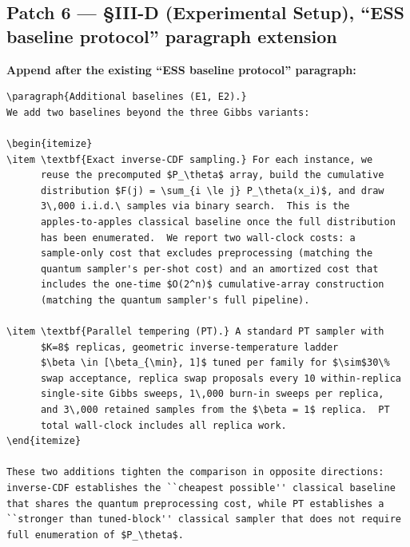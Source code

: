 \subsection*{Patch 6 --- \S III-D (Experimental Setup),
``ESS baseline protocol'' paragraph extension}

\textbf{Append after the existing ``ESS baseline protocol'' paragraph:}

\begin{verbatim}
\paragraph{Additional baselines (E1, E2).}
We add two baselines beyond the three Gibbs variants:

\begin{itemize}
\item \textbf{Exact inverse-CDF sampling.} For each instance, we
      reuse the precomputed $P_\theta$ array, build the cumulative
      distribution $F(j) = \sum_{i \le j} P_\theta(x_i)$, and draw
      3\,000 i.i.d.\ samples via binary search.  This is the
      apples-to-apples classical baseline once the full distribution
      has been enumerated.  We report two wall-clock costs: a
      sample-only cost that excludes preprocessing (matching the
      quantum sampler's per-shot cost) and an amortized cost that
      includes the one-time $O(2^n)$ cumulative-array construction
      (matching the quantum sampler's full pipeline).

\item \textbf{Parallel tempering (PT).} A standard PT sampler with
      $K=8$ replicas, geometric inverse-temperature ladder
      $\beta \in [\beta_{\min}, 1]$ tuned per family for $\sim$30\%
      swap acceptance, replica swap proposals every 10 within-replica
      single-site Gibbs sweeps, 1\,000 burn-in sweeps per replica,
      and 3\,000 retained samples from the $\beta = 1$ replica.  PT
      total wall-clock includes all replica work.
\end{itemize}

These two additions tighten the comparison in opposite directions:
inverse-CDF establishes the ``cheapest possible'' classical baseline
that shares the quantum preprocessing cost, while PT establishes a
``stronger than tuned-block'' classical sampler that does not require
full enumeration of $P_\theta$.
\end{verbatim}

